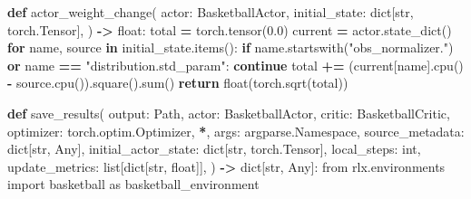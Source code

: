 \documentclass[
  american,
  11pt,
  letterpaper,
]{article}
\newenvironment{Shaded}{\begin{snugshade}}{\end{snugshade}}
\newcommand{\BuiltInTok}[1]{#1}
\newcommand{\ControlFlowTok}[1]{\textcolor[rgb]{0.13,0.29,0.53}{\textbf{#1}}}
\newcommand{\FloatTok}[1]{\textcolor[rgb]{0.00,0.00,0.81}{#1}}
\newcommand{\ImportTok}[1]{#1}
\newcommand{\KeywordTok}[1]{\textcolor[rgb]{0.13,0.29,0.53}{\textbf{#1}}}
\newcommand{\NormalTok}[1]{#1}
\newcommand{\OperatorTok}[1]{\textcolor[rgb]{0.81,0.36,0.00}{\textbf{#1}}}
\newcommand{\StringTok}[1]{\textcolor[rgb]{0.31,0.60,0.02}{#1}}
\renewenvironment{Shaded}{\par\smallskip}{\par\smallskip}
\begin{document}
\begin{Shaded}
\begin{Highlighting}[]
\KeywordTok{def}\NormalTok{ actor\_weight\_change(}
\NormalTok{    actor: BasketballActor,}
\NormalTok{    initial\_state: }\BuiltInTok{dict}\NormalTok{[}\BuiltInTok{str}\NormalTok{, torch.Tensor],}
\NormalTok{) }\OperatorTok{{-}\textgreater{}} \BuiltInTok{float}\NormalTok{:}
\NormalTok{    total }\OperatorTok{=}\NormalTok{ torch.tensor(}\FloatTok{0.0}\NormalTok{)}
\NormalTok{    current }\OperatorTok{=}\NormalTok{ actor.state\_dict()}
    \ControlFlowTok{for}\NormalTok{ name, source }\KeywordTok{in}\NormalTok{ initial\_state.items():}
        \ControlFlowTok{if}\NormalTok{ name.startswith(}\StringTok{"obs\_normalizer."}\NormalTok{) }\KeywordTok{or}\NormalTok{ name }\OperatorTok{==} \StringTok{"distribution.std\_param"}\NormalTok{:}
            \ControlFlowTok{continue}
\NormalTok{        total }\OperatorTok{+=}\NormalTok{ (current[name].cpu() }\OperatorTok{{-}}\NormalTok{ source.cpu()).square().}\BuiltInTok{sum}\NormalTok{()}
    \ControlFlowTok{return} \BuiltInTok{float}\NormalTok{(torch.sqrt(total))}


\KeywordTok{def}\NormalTok{ save\_results(}
\NormalTok{    output: Path,}
\NormalTok{    actor: BasketballActor,}
\NormalTok{    critic: BasketballCritic,}
\NormalTok{    optimizer: torch.optim.Optimizer,}
    \OperatorTok{*}\NormalTok{,}
\NormalTok{    args: argparse.Namespace,}
\NormalTok{    source\_metadata: }\BuiltInTok{dict}\NormalTok{[}\BuiltInTok{str}\NormalTok{, Any],}
\NormalTok{    initial\_actor\_state: }\BuiltInTok{dict}\NormalTok{[}\BuiltInTok{str}\NormalTok{, torch.Tensor],}
\NormalTok{    local\_steps: }\BuiltInTok{int}\NormalTok{,}
\NormalTok{    update\_metrics: }\BuiltInTok{list}\NormalTok{[}\BuiltInTok{dict}\NormalTok{[}\BuiltInTok{str}\NormalTok{, }\BuiltInTok{float}\NormalTok{]],}
\NormalTok{) }\OperatorTok{{-}\textgreater{}} \BuiltInTok{dict}\NormalTok{[}\BuiltInTok{str}\NormalTok{, Any]:}
    \ImportTok{from}\NormalTok{ rlx.environments }\ImportTok{import}\NormalTok{ basketball }\ImportTok{as}\NormalTok{ basketball\_environment}


\end{Highlighting}
\end{Shaded}
\end{document}
